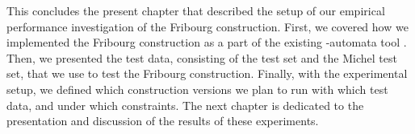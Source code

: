 This concludes the present chapter that described the setup of our empirical performance investigation of the Fribourg construction. First, we covered how we implemented the Fribourg construction as a part of the existing \om-automata tool \goal. Then, we presented the test data, consisting of the \goal{} test set and the Michel test set, that we use to test the Fribourg construction. Finally, with the experimental setup, we defined which construction versions we plan to run with which test data, and under which constraints. The next chapter is dedicated to the presentation and discussion of the results of these experiments.

